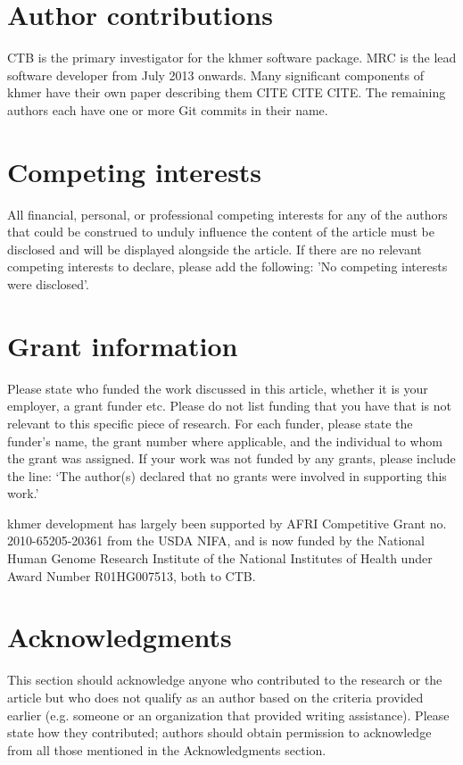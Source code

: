 \documentclass[10pt,a4paper,twocolumn]{article}
\begin{document}
\section*{Author contributions}
CTB is the primary investigator for the khmer software package. MRC is the lead software developer from July 2013 onwards. Many significant components of khmer have their own paper describing them CITE CITE CITE. The remaining authors each have one or more Git commits in their name.

\section*{Competing interests}
All financial, personal, or professional competing interests for any of the authors that
could be construed to unduly influence the content of the article must be disclosed and will be displayed alongside the article. If there are no relevant competing interests to declare, please add the following: 'No competing interests were disclosed'.

\section*{Grant information}
Please state who funded the work discussed in this article, whether it is your employer, a grant funder etc. Please do not list funding that you have that is not relevant to this
specific piece of research. For each funder, please state the funder’s name, the grant
number where applicable, and the individual to whom the grant was assigned.
If your work was not funded by any grants, please include the line: ‘The author(s)
declared that no grants were involved in supporting this work.’

khmer development has largely been supported by AFRI Competitive Grant
no. 2010-65205-20361 from the USDA NIFA, and is now funded by the
National Human Genome Research Institute of the National Institutes of
Health under Award Number R01HG007513, both to CTB.

\section*{Acknowledgments}
This section should acknowledge anyone who contributed to the research or the
article but who does not qualify as an author based on the criteria provided earlier
(e.g. someone or an organization that provided writing assistance). Please state how
they contributed; authors should obtain permission to acknowledge from all those
mentioned in the Acknowledgments section.
\end{document}
